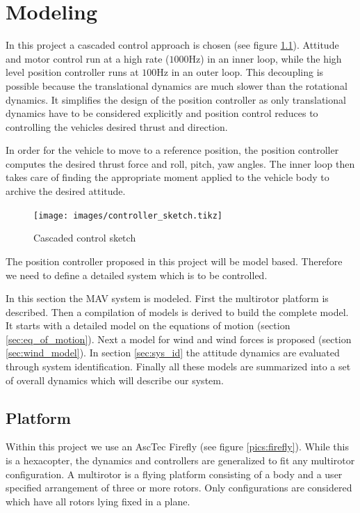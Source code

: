 \chapter{Modeling}
\label{sec:modeling}
In this project a cascaded control approach is chosen (see figure \ref{pics:controller_sketch}). Attitude and motor control run at a high rate ($1000 \si{\hertz}$) in an inner loop, while the high level position controller runs at $100 \si{\hertz}$ in an outer loop. This decoupling is possible because the translational dynamics are much slower than the rotational dynamics. It simplifies the design of the position controller as only translational dynamics have to be considered explicitly and position control reduces to controlling the vehicles desired thrust and direction. 

In order for the vehicle to move to a reference position, the position controller computes the desired thrust force and roll, pitch, yaw angles. The inner loop then takes care of finding the appropriate moment applied to the vehicle body to archive the desired attitude. 

\begin{figure}
\centering
\texttt{[image: images/controller\_sketch.tikz]}
\caption{Cascaded control sketch}
\label{pics:controller_sketch}
\end{figure}

The position controller proposed in this project will be model based. Therefore we need to define a detailed system which is to be controlled.


In this section the MAV system is modeled. First the multirotor platform is described. Then a compilation of models is derived to build the complete model. It starts with a detailed model on the equations of motion (section \ref{sec:eq_of_motion}). Next a model for wind and wind forces is proposed (section \ref{sec:wind_model}). In section \ref{sec:sys_id} the attitude dynamics are evaluated through system identification. Finally all these models are summarized into a set of overall dynamics which will describe our system.

\section{Platform}
Within this project we use an AscTec Firefly (see figure \ref{pics:firefly}). While this is a hexacopter, the dynamics and controllers are generalized to fit any multirotor configuration. A multirotor is a flying platform consisting of a body and a user specified arrangement of three or more rotors. Only configurations are considered which have all rotors lying fixed in a plane.

